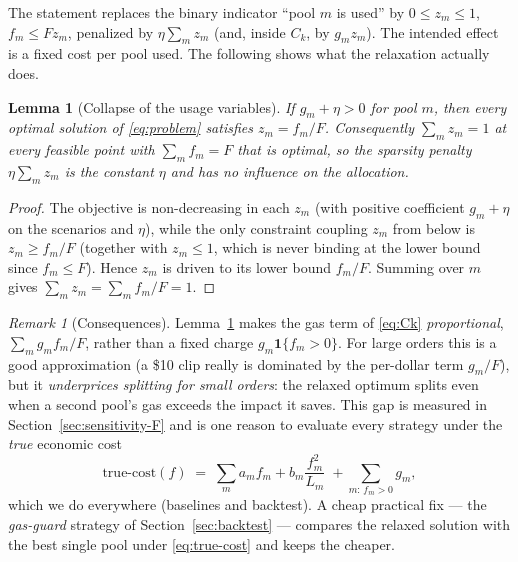 \documentclass[11pt,a4paper]{article}
\newtheorem{lemma}{Lemma}
\theoremstyle{remark}
\newtheorem{remark}{Remark}
\begin{document}
The statement replaces the binary indicator ``pool $m$ is used'' by
$0\le z_m\le 1$, $f_m\le F z_m$, penalized by $\eta\sum_m z_m$ (and, inside $C_k$, by
$g_m z_m$).  The intended effect is a fixed cost per pool used.  The following shows what
the relaxation actually does.

\begin{lemma}[Collapse of the usage variables]
\label{lem:collapse}
If $g_m+\eta>0$ for pool $m$, then every optimal solution of \eqref{eq:problem} satisfies
$z_m = f_m/F$.  Consequently $\sum_m z_m = 1$ at every feasible point with $\sum_m f_m=F$
that is optimal, so the sparsity penalty $\eta\sum_m z_m$ is the constant $\eta$ and has no
influence on the allocation.
\end{lemma}

\begin{proof}
The objective is non-decreasing in each $z_m$ (with positive coefficient $g_m+\eta$ on the
scenarios and $\eta$), while the only constraint coupling $z_m$ from below is
$z_m \ge f_m/F$ (together with $z_m\le 1$, which is never binding at the lower bound since
$f_m\le F$).  Hence $z_m$ is driven to its lower bound $f_m/F$.  Summing over $m$ gives
$\sum_m z_m = \sum_m f_m/F = 1$.
\end{proof}

\begin{remark}[Consequences]
Lemma~\ref{lem:collapse} makes the gas term of \eqref{eq:Ck} \emph{proportional},
$\sum_m g_m f_m/F$, rather than a fixed charge $g_m\mathbf{1}\{f_m>0\}$.  For large orders
this is a good approximation (a \$10 clip really is dominated by the per-dollar term
$g_m/F$), but it \emph{underprices splitting for small orders}: the relaxed optimum splits
even when a second pool's gas exceeds the impact it saves.  This gap is measured in
Section~\ref{sec:sensitivity-F} and is one reason to evaluate every strategy under the
\emph{true} economic cost
\begin{equation}
\label{eq:true-cost}
  \text{true-cost}(f) \;=\; \sum_m a_m f_m + b_m \frac{f_m^{2}}{L_m}
  \;+\!\!\sum_{m:\,f_m>0}\!\! g_m ,
\end{equation}
which we do everywhere (baselines and backtest).  A cheap practical fix --- the
\emph{gas-guard} strategy of Section~\ref{sec:backtest} --- compares the relaxed solution
with the best single pool under \eqref{eq:true-cost} and keeps the cheaper.
\end{remark}

\end{document}

